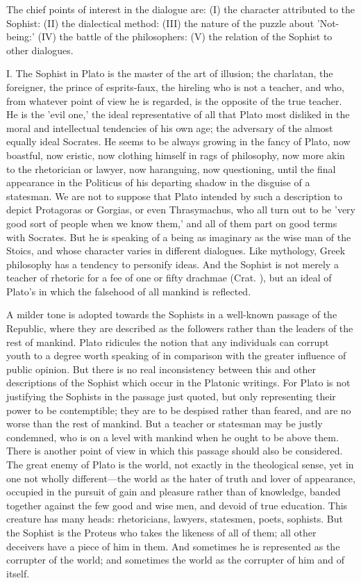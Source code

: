 \documentclass[11pt,letter]{article}
\begin{document}
\par  The chief points of interest in the dialogue are: (I) the character attributed to the Sophist: (II) the dialectical method: (III) the nature of the puzzle about 'Not-being:' (IV) the battle of the philosophers: (V) the relation of the Sophist to other dialogues.

\par  I. The Sophist in Plato is the master of the art of illusion; the charlatan, the foreigner, the prince of esprits-faux, the hireling who is not a teacher, and who, from whatever point of view he is regarded, is the opposite of the true teacher. He is the 'evil one,' the ideal representative of all that Plato most disliked in the moral and intellectual tendencies of his own age; the adversary of the almost equally ideal Socrates. He seems to be always growing in the fancy of Plato, now boastful, now eristic, now clothing himself in rags of philosophy, now more akin to the rhetorician or lawyer, now haranguing, now questioning, until the final appearance in the Politicus of his departing shadow in the disguise of a statesman. We are not to suppose that Plato intended by such a description to depict Protagoras or Gorgias, or even Thrasymachus, who all turn out to be 'very good sort of people when we know them,' and all of them part on good terms with Socrates. But he is speaking of a being as imaginary as the wise man of the Stoics, and whose character varies in different dialogues. Like mythology, Greek philosophy has a tendency to personify ideas. And the Sophist is not merely a teacher of rhetoric for a fee of one or fifty drachmae (Crat. ), but an ideal of Plato's in which the falsehood of all mankind is reflected.

\par  A milder tone is adopted towards the Sophists in a well-known passage of the Republic, where they are described as the followers rather than the leaders of the rest of mankind. Plato ridicules the notion that any individuals can corrupt youth to a degree worth speaking of in comparison with the greater influence of public opinion. But there is no real inconsistency between this and other descriptions of the Sophist which occur in the Platonic writings. For Plato is not justifying the Sophists in the passage just quoted, but only representing their power to be contemptible; they are to be despised rather than feared, and are no worse than the rest of mankind. But a teacher or statesman may be justly condemned, who is on a level with mankind when he ought to be above them. There is another point of view in which this passage should also be considered. The great enemy of Plato is the world, not exactly in the theological sense, yet in one not wholly different—the world as the hater of truth and lover of appearance, occupied in the pursuit of gain and pleasure rather than of knowledge, banded together against the few good and wise men, and devoid of true education. This creature has many heads: rhetoricians, lawyers, statesmen, poets, sophists. But the Sophist is the Proteus who takes the likeness of all of them; all other deceivers have a piece of him in them. And sometimes he is represented as the corrupter of the world; and sometimes the world as the corrupter of him and of itself.
\end{document}
